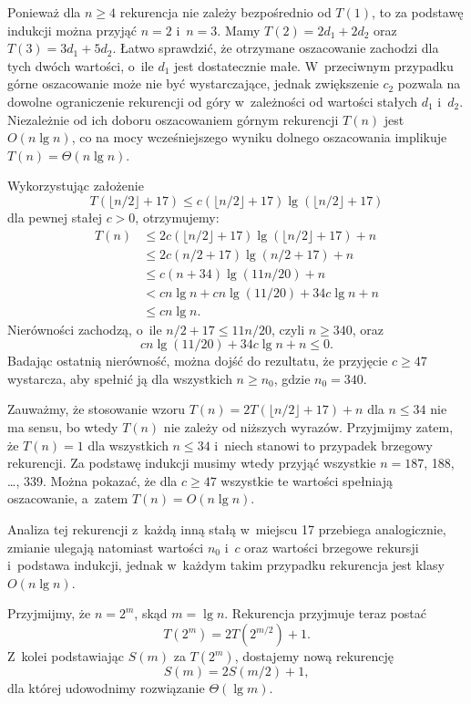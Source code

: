 Ponieważ dla $n\ge4$ rekurencja nie zależy bezpośrednio od $T(1)$, to za podstawę indukcji można przyjąć $n=2$ i~$n=3$.
Mamy $T(2)=2d_1+2d_2$ oraz $T(3)=3d_1+5d_2$.
Łatwo sprawdzić, że otrzymane oszacowanie zachodzi dla tych dwóch wartości, o~ile $d_1$ jest dostatecznie małe.
W~przeciwnym przypadku górne oszacowanie może nie być wystarczające, jednak zwiększenie $c_2$ pozwala na dowolne ograniczenie rekurencji od góry w~zależności od wartości stałych $d_1$ i~$d_2$.
Niezależnie od ich doboru oszacowaniem górnym rekurencji $T(n)$ jest $O(n\lg n)$, co na mocy wcześniejszego wyniku dolnego oszacowania implikuje $T(n)=\Theta(n\lg n)$.

\exercise %
Wykorzystując założenie
\[
	T(\lfloor n/2\rfloor+17) \le c(\lfloor n/2\rfloor+17)\lg(\lfloor n/2\rfloor+17)
\]
dla pewnej stałej $c>0$, otrzymujemy:
\begin{align*}
	T(n) &\le 2c(\lfloor n/2\rfloor+17)\lg(\lfloor n/2\rfloor+17)+n \\
	&\le 2c(n/2+17)\lg(n/2+17)+n \\
	&\le c(n+34)\lg(11n/20)+n \\
	&< cn\lg n+cn\lg(11/20)+34c\lg n+n \\
	&\le cn\lg n.
\end{align*}
Nierówności zachodzą, o~ile $n/2+17\le 11n/20$, czyli $n\ge340$, oraz
\[
	cn\lg(11/20)+34c\lg n+n \le 0.
\]
Badając ostatnią nierówność, można dojść do rezultatu, że przyjęcie $c\ge47$ wystarcza, aby spełnić ją dla wszystkich $n\ge n_0$, gdzie $n_0=340$.

Zauważmy, że stosowanie wzoru $T(n)=2T(\lfloor n/2\rfloor+17)+n$ dla $n\le34$ nie ma sensu, bo wtedy $T(n)$ nie zależy od niższych wyrazów.
Przyjmijmy zatem, że $T(n)=1$ dla wszystkich $n\le34$ i~niech stanowi to przypadek brzegowy rekurencji.
Za podstawę indukcji musimy wtedy przyjąć wszystkie $n=187$, 188, \dots, 339.
Można pokazać, że dla $c\ge47$ wszystkie te wartości spełniają oszacowanie, a~zatem $T(n)=O(n\lg n)$.

Analiza tej rekurencji z~każdą inną stałą w~miejscu 17 przebiega analogicznie, zmianie ulegają natomiast wartości $n_0$ i~$c$ oraz wartości brzegowe rekursji i~podstawa indukcji, jednak w~każdym takim przypadku rekurencja jest klasy $O(n\lg n)$.

\exercise %
Przyjmijmy, że $n=2^m$, skąd $m=\lg n$.
Rekurencja przyjmuje teraz postać
\[
	T(2^m) = 2T(2^{m/2})+1.
\]
Z~kolei podstawiając $S(m)$ za $T(2^m)$, dostajemy nową rekurencję
\[
	S(m) = 2S(m/2)+1,
\]
dla której udowodnimy rozwiązanie $\Theta(\lg m)$.

